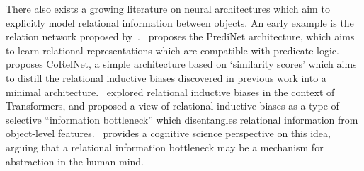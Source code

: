 There also exists a growing literature on neural architectures which aim to explicitly model relational information between objects. An early example is the relation network proposed by~\citet{santoroSimpleNeural2017}.~\citet{shanahanExplicitlyRelationalNeural} proposes the PrediNet architecture, which aims to learn relational representations which are compatible with predicate logic.
~\citet{kergNeuralArchitecture2022} proposes CoRelNet, a simple architecture based on `similarity scores' which aims to distill the relational inductive biases discovered in previous work into a minimal architecture.~\citet{altabaaAbstractorsTransformer2023} explored relational inductive biases in the context of Transformers, and proposed a view of relational inductive biases as a type of selective ``information bottleneck'' which disentangles relational information from object-level features.~\citet{webbRelationalBottleneckInductive2023} provides a cognitive science perspective on this idea, arguing that a relational information bottleneck may be a mechanism for abstraction in the human mind.%
